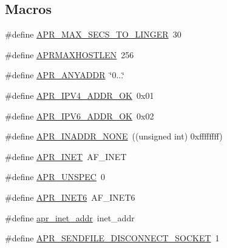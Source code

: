 \subsection*{Macros}
\begin{DoxyCompactItemize}
\item 
\#define \hyperlink{group__apr__network__io_ga8311c84f6946742188a6b9a45e92ea8e}{A\+P\+R\+\_\+\+M\+A\+X\+\_\+\+S\+E\+C\+S\+\_\+\+T\+O\+\_\+\+L\+I\+N\+G\+ER}~30
\item 
\#define \hyperlink{group__apr__network__io_ga7f5b3882209106bb407b1d518d6ad59d}{A\+P\+R\+M\+A\+X\+H\+O\+S\+T\+L\+EN}~256
\item 
\#define \hyperlink{group__apr__network__io_gadce1131c46b897ec63e9e4316a4631dd}{A\+P\+R\+\_\+\+A\+N\+Y\+A\+D\+DR}~\char`\"{}0...\char`\"{}
\item 
\#define \hyperlink{group__apr__network__io_ga58aa30a94127b4a80f27fbf2e03fdfd8}{A\+P\+R\+\_\+\+I\+P\+V4\+\_\+\+A\+D\+D\+R\+\_\+\+OK}~0x01
\item 
\#define \hyperlink{group__apr__network__io_gaef1f70f9b969d25832a230f429837207}{A\+P\+R\+\_\+\+I\+P\+V6\+\_\+\+A\+D\+D\+R\+\_\+\+OK}~0x02
\item 
\#define \hyperlink{group__apr__network__io_ga16eb7ee55ff87a5093f2114ea5351217}{A\+P\+R\+\_\+\+I\+N\+A\+D\+D\+R\+\_\+\+N\+O\+NE}~((unsigned int) 0xffffffff)
\item 
\#define \hyperlink{group__apr__network__io_gaa96e8e8dbf92bc77643a4032017b3d67}{A\+P\+R\+\_\+\+I\+N\+ET}~A\+F\+\_\+\+I\+N\+ET
\item 
\#define \hyperlink{group__apr__network__io_gaa7a33b17a7d0820b09ef489bd3328f85}{A\+P\+R\+\_\+\+U\+N\+S\+P\+EC}~0
\item 
\#define \hyperlink{group__apr__network__io_gad09d9ea8995f50f35073ae0c77efb44f}{A\+P\+R\+\_\+\+I\+N\+E\+T6}~A\+F\+\_\+\+I\+N\+E\+T6
\item 
\#define \hyperlink{group__apr__network__io_ga46a8b06887871cfd60a3e37385775e22}{apr\+\_\+inet\+\_\+addr}~inet\+\_\+addr
\item 
\#define \hyperlink{group__apr__network__io_gaca378d0e24b1588e3fdb143e4ea9090d}{A\+P\+R\+\_\+\+S\+E\+N\+D\+F\+I\+L\+E\+\_\+\+D\+I\+S\+C\+O\+N\+N\+E\+C\+T\+\_\+\+S\+O\+C\+K\+ET}~1
\end{DoxyCompactItemize}
